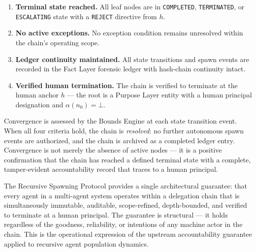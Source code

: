 \begin{enumerate}
    \item[(C1)] \textbf{Terminal state reached.} All leaf nodes are in \texttt{COMPLETED}, \texttt{TERMINATED}, or \texttt{ESCALATING} state with a \texttt{REJECT} directive from $h$.
    \item[(C2)] \textbf{No active exceptions.} No exception condition remains unresolved within the chain's operating scope.
    \item[(C3)] \textbf{Ledger continuity maintained.} All state transitions and spawn events are recorded in the Fact Layer forensic ledger with hash-chain continuity intact.
    \item[(C4)] \textbf{Verified human termination.} The chain is verified to terminate at the human anchor $h$ — the root is a Purpose Layer entity with a human principal designation and $\alpha(n_0) = \bot$.
\end{enumerate}

Convergence is assessed by the Bounds Engine at each state transition event. When all four criteria hold, the chain is \emph{resolved}: no further autonomous spawn events are authorized, and the chain is archived as a completed ledger entry. Convergence is not merely the absence of active nodes — it is a positive confirmation that the chain has reached a defined terminal state with a complete, tamper-evident accountability record that traces to a human principal.

\medskip
The Recursive Spawning Protocol provides a single architectural guarantee: that every agent in a multi-agent system operates within a delegation chain that is simultaneously immutable, auditable, scope-refined, depth-bounded, and verified to terminate at a human principal. The guarantee is structural — it holds regardless of the goodness, reliability, or intentions of any machine actor in the chain. This is the operational expression of the upstream \bxthree{} accountability guarantee applied to recursive agent population dynamics.